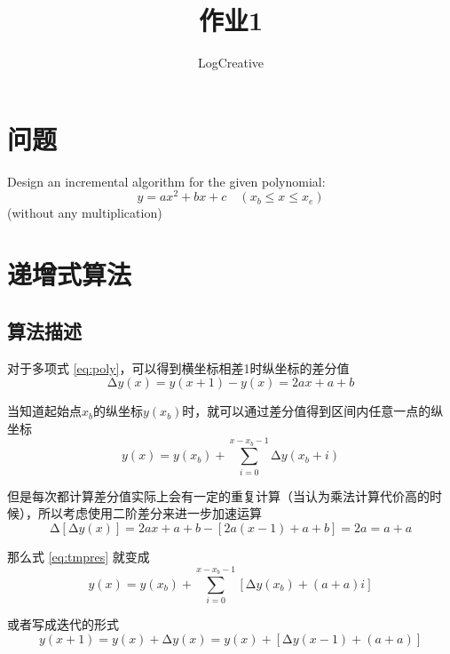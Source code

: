 \documentclass[math-font=newcm]{sjtuarticle}
\title{作业1}
\author{LogCreative}
\begin{document}
\maketitle

\tableofcontents*
\clearpage

\section{问题}

Design an incremental algorithm for the given polynomial:
\begin{equation}\label{eq:poly}
    y=ax^2+bx+c\quad(x_b\leq x\leq x_e)
\end{equation}
(without any multiplication)

\section{递增式算法}

\subsection{算法描述}

对于多项式 \eqref{eq:poly}，可以得到横坐标相差1时纵坐标的差分值
\begin{equation}
    \increment y(x)=y(x+1)-y(x)=2ax+a+b
\end{equation}

当知道起始点$x_b$的纵坐标$y(x_b)$时，就可以通过差分值得到区间内任意一点的纵坐标
\begin{equation}\label{eq:tmpres}
    y(x)=y(x_b)+\sum_{i=0}^{x-x_b-1}\increment y(x_b+i)
\end{equation}

但是每次都计算差分值实际上会有一定的重复计算（当认为乘法计算代价高的时候），所以考虑使用二阶差分来进一步加速运算
\begin{equation}
    \increment[\increment y(x)]=2ax+a+b-[2a(x-1)+a+b]=2a=a+a
\end{equation}

那么式 \eqref{eq:tmpres} 就变成
\begin{equation}\label{eq:res}
    y(x)=y(x_b)+\sum_{i=0}^{x-x_b-1}[\increment y(x_b)+(a+a)i]
\end{equation}

或者写成迭代的形式
\begin{equation}
    y(x+1)=y(x)+\increment y(x)=y(x)+[\increment y(x-1)+(a+a)]
\end{equation}
\end{document}
